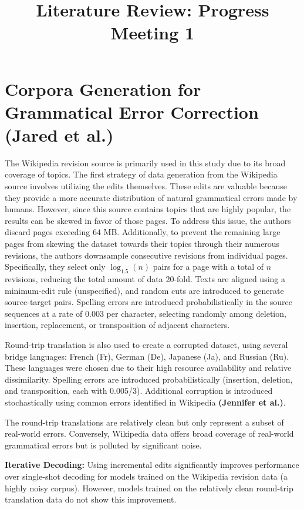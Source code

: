 \documentclass{article}
\title{Literature Review: Progress Meeting 1}
\author{}
\date{}
\begin{document}
\maketitle

\section{Corpora Generation for Grammatical Error Correction (Jared et al.)}

The Wikipedia revision source is primarily used in this study due to its broad coverage of topics. The first strategy of data generation from the Wikipedia source involves utilizing the edits themselves. These edits are valuable because they provide a more accurate distribution of natural grammatical errors made by humans. However, since this source contains topics that are highly popular, the results can be skewed in favor of those pages. To address this issue, the authors discard pages exceeding 64 MB. Additionally, to prevent the remaining large pages from skewing the dataset towards their topics through their numerous revisions, the authors downsample consecutive revisions from individual pages. Specifically, they select only $\log_{1.5}(n)$ pairs for a page with a total of $n$ revisions, reducing the total amount of data 20-fold. Texts are aligned using a minimum-edit rule (unspecified), and random cuts are introduced to generate source-target pairs. Spelling errors are introduced probabilistically in the source sequences at a rate of 0.003 per character, selecting randomly among deletion, insertion, replacement, or transposition of adjacent characters.

Round-trip translation is also used to create a corrupted dataset, using several bridge languages: French (Fr), German (De), Japanese (Ja), and Russian (Ru). These languages were chosen due to their high resource availability and relative dissimilarity. Spelling errors are introduced probabilistically (insertion, deletion, and transposition, each with 0.005/3). Additional corruption is introduced stochastically using common errors identified in Wikipedia \textbf{(Jennifer et al.)}.

The round-trip translations are relatively clean but only represent a subset of real-world errors. Conversely, Wikipedia data offers broad coverage of real-world grammatical errors but is polluted by significant noise.

\textbf{Iterative Decoding:} Using incremental edits significantly improves performance over single-shot decoding for models trained on the Wikipedia revision data (a highly noisy corpus). However, models trained on the relatively clean round-trip translation data do not show this improvement.
\end{document}
